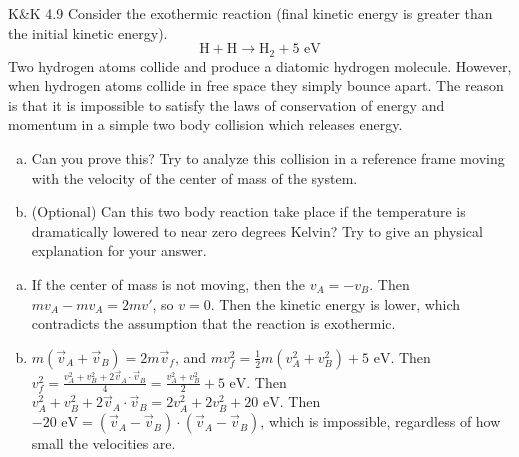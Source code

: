 \documentclass{esg8012pset}
\begin{document}
\begin{problem}{K\&K 4.9}
  Consider the exothermic reaction (final kinetic energy is greater than the initial kinetic energy).
  $$\text{H} + \text{H} \to \text{H}_2 + 5\text{ eV}$$
  Two hydrogen atoms collide and produce a diatomic hydrogen molecule. However, when hydrogen atoms collide in free space they simply bounce apart. The reason is that it is impossible to satisfy the laws of conservation of energy and momentum in a simple two body collision which releases energy.
  \begin{enumerate}[(a)]
    \item Can you prove this? Try to analyze this collision in a reference frame moving with the velocity of the center of mass of the system.
    \item (Optional) Can this two body reaction take place if the temperature is dramatically lowered to near zero degrees Kelvin? Try to give an physical explanation for your answer.
  \end{enumerate}
\end{problem}
\begin{solution}
  \begin{enumerate}[(a)]
  \item If the center of mass is not moving, then the $v_A = -v_B$.  Then $m v_A - m v_A = 2 m v'$, so $v = 0$.  Then the kinetic energy is lower, which contradicts the assumption that the reaction is exothermic.
    \item $m(\vec v_A + \vec v_B) = 2 m \vec v_f$, and $mv_f^2 = \frac{1}{2}m(v_A^2 + v_B^2) + 5\text{ eV}$.  Then $v_f^2 = \frac{v_A^2 + v_B^2 + 2\vec v_A \cdot \vec v_B}{4} = \frac{v_A^2 + v_B^2}{2} + 5\text{ eV}$.  Then $v_A^2 + v_B^2 + 2\vec v_A \cdot \vec v_B = 2v_A^2 + 2v_B^2 + 20\text{ eV}$.  Then $-20\text{ eV} = (\vec v_A - \vec v_B)\cdot(\vec v_A - \vec v_B)$, which is impossible, regardless of how small the velocities are.
  \end{enumerate}
\end{solution}
\end{document}
